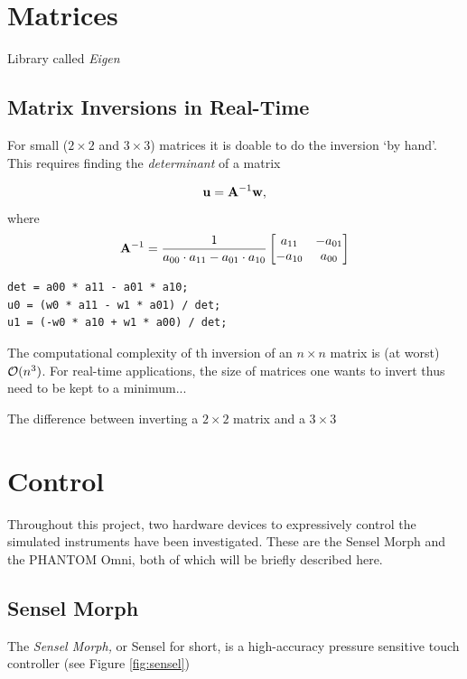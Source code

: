 \section{Matrices}\label{sec:realTimeMatrices}

Library called \textit{Eigen} \cite{Eigen}

\subsection{Matrix Inversions in Real-Time}\label{sec:RTmatrixInversion}
For small ($2\times 2$ and $3\times 3$) matrices it is doable to do the inversion `by hand'. This requires finding the \textit{determinant} of a matrix

\begin{equation*}
    \mathbf{u} = \mathbf{A}^{-1}\mathbf{w}, 
\end{equation*}
where
\begin{equation}
    \mathbf{A}^{-1} = \frac{1}{a_{00}\cdot a_{11} - a_{01}\cdot a_{10}}
    \begin{bmatrix}
        a_{11} & -a_{01}\\
        -a_{10} & a_{00} 
    \end{bmatrix}
\end{equation}

\setlstCpp
\begin{lstlisting}
det = a00 * a11 - a01 * a10;
u0 = (w0 * a11 - w1 * a01) / det;
u1 = (-w0 * a10 + w1 * a00) / det;
\end{lstlisting}


The computational complexity of th inversion of an $n\times n$ matrix is (at worst) $\mathcal{O}(n^3)$. For real-time applications, the size of matrices one wants to invert thus need to be kept to a minimum...

The difference between inverting a $2\times 2$ matrix and a $3\times 3$ 

\section{Control}
Throughout this project, two hardware devices to expressively control the simulated instruments have been investigated. These are the Sensel Morph and the PHANTOM Omni, both of which will be briefly described here.

\subsection{Sensel Morph}\label{sec:sensel}
The \textit{Sensel Morph,} or Sensel for short, is a high-accuracy pressure sensitive touch controller (see Figure \ref{fig:sensel})

